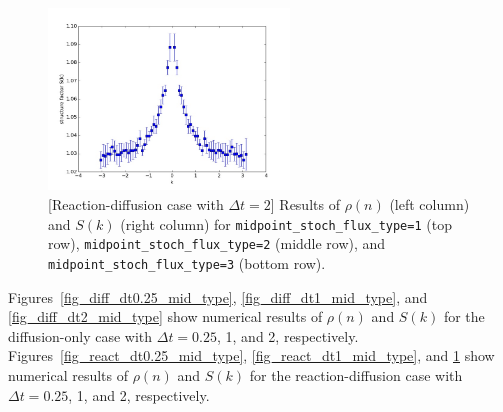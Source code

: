 \documentclass{article}
\begin{document}
\begin{figure}
\includegraphics[width=0.5\linewidth,height=1.9in]{fig1/react_dt2_Sk_mid3.jpg}
\caption{\label{fig_react_dt2_mid_type}[Reaction-diffusion case with $\Delta t=2$] Results of $\rho(n)$ (left column) and $S(k)$ (right column) for \texttt{midpoint\_stoch\_flux\_type=1} (top row), \texttt{midpoint\_stoch\_flux\_type=2} (middle row), and \texttt{midpoint\_stoch\_flux\_type=3} (bottom row).
}
\end{figure}

Figures~\ref{fig_diff_dt0.25_mid_type}, \ref{fig_diff_dt1_mid_type}, and \ref{fig_diff_dt2_mid_type} show numerical results of $\rho(n)$ and $S(k)$ for the diffusion-only case with $\Delta t=0.25$, 1, and 2, respectively.
Figures~\ref{fig_react_dt0.25_mid_type}, \ref{fig_react_dt1_mid_type}, and \ref{fig_react_dt2_mid_type} show numerical results of $\rho(n)$ and $S(k)$ for the reaction-diffusion case with $\Delta t=0.25$, 1, and 2, respectively.
\end{document}

